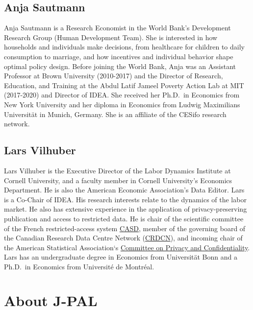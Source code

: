 \documentclass[
]{book}
\begin{document}
\hypertarget{anja-sautmann}{%
\subsection*{Anja Sautmann}\label{anja-sautmann}}

Anja Sautmann is a Research Economist in the World Bank's Development Research Group (Human Development Team). She is interested in how households and individuals make decisions, from healthcare for children to daily consumption to marriage, and how incentives and individual behavior shape optimal policy design. Before joining the World Bank, Anja was an Assistant Professor at Brown University (2010-2017) and the Director of Research, Education, and Training at the Abdul Latif Jameel Poverty Action Lab at MIT (2017-2020) and Director of IDEA. She received her Ph.D.~in Economics from New York University and her diploma in Economics from Ludwig Maximilians Universität in Munich, Germany. She is an affiliate of the CESifo research network.

\hypertarget{lars-vilhuber}{%
\subsection*{Lars Vilhuber}\label{lars-vilhuber}}

Lars Vilhuber is the Executive Director of the Labor Dynamics Institute at Cornell University, and a faculty member in Cornell University's Economics Department. He is also the American Economic Association's Data Editor. Lars is a Co-Chair of IDEA. His research interests relate to the dynamics of the labor market. He also has extensive experience in the application of privacy-preserving publication and access to restricted data. He is chair of the scientific committee of the French restricted-access system \href{https://casd.eu}{CASD}, member of the governing board of the Canadian Research Data Centre Network (\href{https://crdcn.org}{CRDCN}), and incoming chair of the American Statistical Association`s \href{https://community.amstat.org/cpc/home}{Committee on Privacy and Confidentiality}. Lars has an undergraduate degree in Economics from Universität Bonn and a Ph.D.~in Economics from Université de Montréal.

\hypertarget{about-j-pal}{%
\section*{About J-PAL}\label{about-j-pal}}
\end{document}
